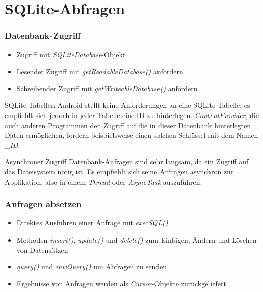 \section{SQLite-Abfragen}
\begin{frame}
   \frametitle{Datenbank-Zugriff}
   \begin{itemize}
   	\item Zugriff mit \emph{SQLiteDatabase}-Objekt 
   	\item Lesender Zugriff mit \emph{getReadableDatabase()} anfordern
   	\item Schreibender Zugriff mit \emph{getWriteableDatabase()} anfordern
   \end{itemize}

	\begin{alertblock}{SQLite-Tabellen}
		Android stellt keine Anforderungen an eine SQLite-Tabelle, 
		es empfiehlt sich jedoch in jeder Tabelle eine ID zu hinterlegen. 
		\emph{ContentProvider}, die auch anderen Programmen den Zugriff auf die in 
		dieser Datenbank hinterlegten Daten ermöglichen, fordern beispielsweise 
		einen solchen Schlüssel mit dem Namen \emph{\_ID}.
	\end{alertblock}
	
	\begin{alertblock}{Asynchroner Zugriff}
		Datenbank-Anfragen sind sehr langsam, da ein Zugriff auf das Dateisystem 
		nötig ist. Es empfiehlt sich seine Anfragen asynchron zur Applikation, 
		also in einem \emph{Thread} oder \emph{AsyncTask} auszuführen.
	\end{alertblock}  
\end{frame}

\begin{frame}
   \frametitle{Anfragen absetzen}
   \begin{itemize}
   	\item Direktes Ausführen einer Anfrage mit \emph{execSQL()}
   	\item Methoden \emph{insert()}, \emph{update()} und \emph{delete()} 
   		zum Einfügen, Ändern und Löschen von Datensätzen
   	\item \emph{query()} und \emph{rawQuery()} um Abfragen zu senden
   	\item Ergebnisse von Anfragen werden als \emph{Cursor}-Objekte zurückgeliefert
   \end{itemize}
\end{frame}

